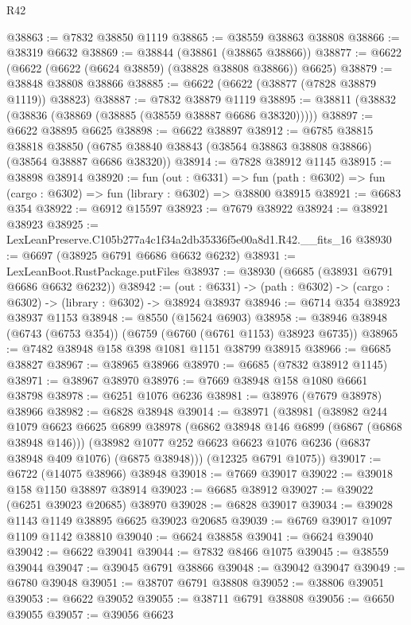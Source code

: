 \begin{lexlean}{R42}
\begin{coremodule}
{@38863 := @7832 @38850 @1119
@38865 := @38559 @38863 @38808
@38866 := @38319 @6632
@38869 := @38844 (@38861 (@38865 @38866))
@38877 := @6622 (@6622 (@6622 (@6624 @38859) (@38828 @38808 @38866)) @6625)
@38879 := @38848 @38808 @38866
@38885 := @6622 (@6622 (@38877 (@7828 @38879 @1119)) @38823)
@38887 := @7832 @38879 @1119
@38895 := @38811 (@38832 (@38836 (@38869 (@38885 (@38559 @38887 @6686 @38320)))))
@38897 := @6622 @38895 @6625
@38898 := @6622 @38897
@38912 := @6785
    @38815
    @38818
    @38850
    (@6785 @38840 @38843 (@38564 @38863 @38808 @38866) (@38564 @38887 @6686 @38320))
@38914 := @7828 @38912 @1145
@38915 := @38898 @38914
@38920 := fun (out : @6331) =>
  fun (path : @6302) => fun (cargo : @6302) => fun (library : @6302) => @38800 @38915
@38921 := @6683 @354
@38922 := @6912 @15597
@38923 := @7679 @38922
@38924 := @38921 @38923
@38925 := LexLeanPreserve.C105b277a4c1f34a2db35336f5e00a8d1.R42.__fits_16
@38930 := @6697 (@38925 @6791 @6686 @6632 @6232)
@38931 := LexLeanBoot.RustPackage.putFiles
@38937 := @38930 (@6685 (@38931 @6791 @6686 @6632 @6232))
@38942 := (out : @6331) -> (path : @6302) -> (cargo : @6302) -> (library : @6302) -> @38924 @38937
@38946 := @6714 @354 @38923 @38937 @1153
@38948 := @8550 (@15624 @6903)
@38958 := @38946 @38948 (@6743 (@6753 @354)) (@6759 (@6760 (@6761 @1153) @38923 @6735))
@38965 := @7482 @38948 @158 @398 @1081 @1151 @38799 @38915
@38966 := @6685 @38827
@38967 := @38965 @38966
@38970 := @6685 (@7832 @38912 @1145)
@38971 := @38967 @38970
@38976 := @7669 @38948 @158 @1080 @6661 @38798
@38978 := @6251 @1076 @6236
@38981 := @38976 (@7679 @38978) @38966
@38982 := @6828 @38948
@39014 := @38971
    (@38981
      (@38982
        @244
        @1079
        @6623
        @6625
        @6899
        @38978
        (@6862 @38948 @146 @6899 (@6867 (@6868 @38948 @146)))
        (@38982 @1077 @252 @6623 @6623 @1076 @6236 (@6837 @38948 @409 @1076) (@6875 @38948)))
      (@12325 @6791 @1075))
@39017 := @6722 (@14075 @38966) @38948
@39018 := @7669 @39017
@39022 := @39018 @158 @1150 @38897 @38914
@39023 := @6685 @38912
@39027 := @39022 (@6251 @39023 @20685) @38970
@39028 := @6828 @39017
@39034 := @39028 @1143 @1149 @38895 @6625 @39023 @20685
@39039 := @6769 @39017 @1097 @1109 @1142 @38810
@39040 := @6624 @38858
@39041 := @6624 @39040
@39042 := @6622 @39041
@39044 := @7832 @8466 @1075
@39045 := @38559 @39044
@39047 := @39045 @6791 @38866
@39048 := @39042 @39047
@39049 := @6780 @39048
@39051 := @38707 @6791 @38808
@39052 := @38806 @39051
@39053 := @6622 @39052
@39055 := @38711 @6791 @38808
@39056 := @6650 @39055
@39057 := @39056 @6623
}
\end{coremodule}
\end{lexlean}
